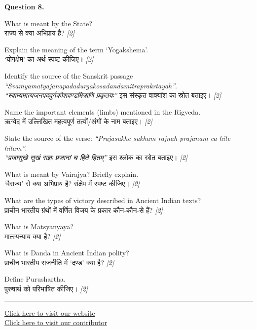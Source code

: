 \documentclass[11pt,a4paper]{article}
\newcommand{\pts}[1]{\hfill \textit{[#1]}}
\begin{document}
\noindent \textbf{Question 8.}
\begin{parts}
  \item What is meant by the State?\\[1pt]
        राज्य से क्या अभिप्राय है? \pts{2}

  \item Explain the meaning of the term `Yogakshema'.\\[1pt]
        `योगक्षेम' का अर्थ स्पष्ट कीजिए। \pts{2}

  \item Identify the source of the Sanskrit passage \textit{``Svamyamatyajanapadadurgakosadandamitraprakrtayah''}.\\[1pt]
        \textit{``स्वाम्यमात्यजनपददुर्गकोशदण्डमित्राणि प्रकृतयः''} इस संस्कृत वाक्यांश का स्रोत बताइए। \pts{2}

  \item Name the important elements (limbs) mentioned in the Rigveda.\\[1pt]
        ऋग्वेद में उल्लिखित महत्वपूर्ण तत्वों/अंगों के नाम बताइए। \pts{2}

  \item State the source of the verse: \textit{``Prajasukhe sukham rajnah prajanam ca hite hitam''}.\\[1pt]
        \textit{``प्रजासुखे सुखं राज्ञः प्रजानां च हिते हितम्''} इस श्लोक का स्रोत बताइए। \pts{2}

  \item What is meant by Vairajya? Briefly explain.\\[1pt]
        `वैराज्य' से क्या अभिप्राय है? संक्षेप में स्पष्ट कीजिए। \pts{2}

  \item What are the types of victory described in Ancient Indian texts?\\[1pt]
        प्राचीन भारतीय ग्रंथों में वर्णित विजय के प्रकार कौन-कौन-से हैं? \pts{2}

  \item What is Matsyanyaya?\\[1pt]
        मात्स्यन्याय क्या है? \pts{2}

  \item What is Danda in Ancient Indian polity?\\[1pt]
        प्राचीन भारतीय राजनीति में `दण्ड' क्या है? \pts{2}

  \item Define Purushartha.\\[1pt]
        पुरुषार्थ को परिभाषित कीजिए। \pts{2}
\end{parts}

\vfill
\rule{\linewidth}{0.4pt}

\begin{center}\small
\href{https://bhu-exam.vercel.app/}{Click here to visit our website}\\[4pt]
\href{https://me-aryan.vercel.app/}{Click here to visit our contributor}
\end{center}
\end{document}

